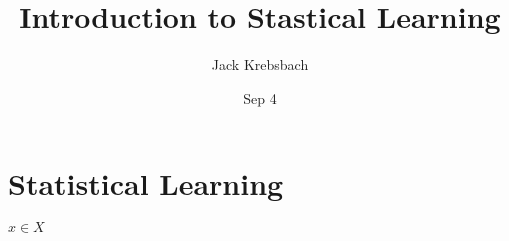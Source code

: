 \documentclass{article}
\title{Introduction to Stastical Learning}
\author{Jack Krebsbach }
\date{Sep 4}
\begin{document}
\maketitle


\section{Statistical Learning}


$x \in X$
\end{document}
